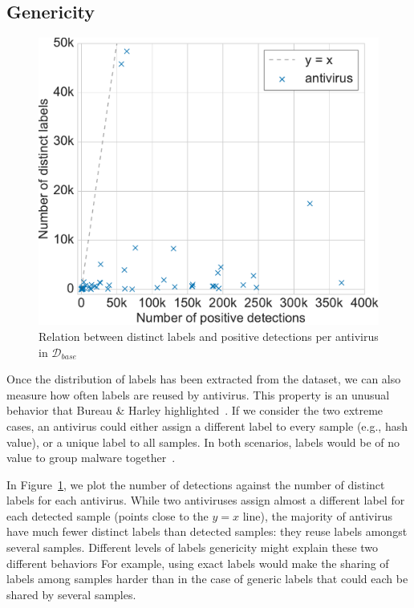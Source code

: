 \subsection{Genericity}

\begin{figure}[!ht]
        \centering
	\includegraphics[width=0.75\linewidth]{figures/stase/genericity.pdf}
        \caption[Relation between distinct labels and positive detections per antivirus]{Relation between distinct labels and positive detections per antivirus in $\mathcal{D}_{base}$}
	\label{figure:stase:genericity}
\end{figure}

Once the distribution of labels has been extracted from the dataset, we can also measure how often labels are reused by antivirus.
This property is an unusual behavior that Bureau \& Harley highlighted~\cite{bureau_dose_2008}.
If we consider the two extreme cases, an antivirus could either assign a different label to every sample (e.g., hash value), or a unique label to all samples.
In both scenarios, labels would be of no value to group malware together~\cite{kruegel_automated_2007}.

In Figure~\ref{figure:stase:genericity}, we plot the number of detections against the number of distinct labels for each antivirus.
While two antiviruses assign almost a different label for each detected sample (points close to the $y=x$ line), the majority of antivirus have much fewer distinct labels than detected samples: they reuse labels amongst several samples.
Different levels of labels genericity might explain these two different behaviors
For example, using exact labels would make the sharing of labels among samples harder than in the case of generic labels that could each be shared by several samples.

